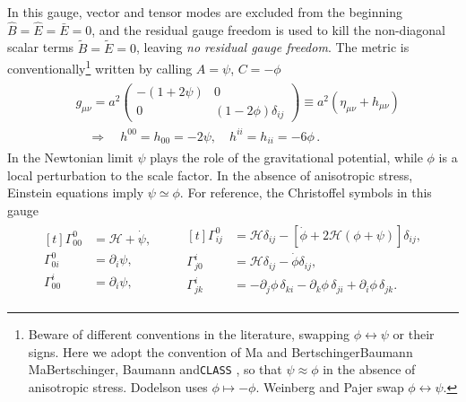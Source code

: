 In this gauge, vector and tensor modes are excluded from the beginning $\hat{B}=\hat{E}=\bar{E}=0$, and the residual gauge freedom is used to kill the non-diagonal scalar terms $\tilde{B}=\tilde{E}=0$, leaving \emph{no residual gauge freedom}.
The metric is conventionally\footnote{Beware of different conventions in the literature, swapping $\phi \leftrightarrow \psi$ or their signs. Here we adopt the convention of Ma and BertschingerBaumann MaBertschinger, Baumann \cite{Baumann_Cosmology_2022} and\texttt{CLASS} \cite{Lesgourgues_CosmicLinearAnisotropySolvingSystemCLASSIOverview_2011}, so that $\psi\approx \phi$ in the absence of anisotropic stress.
Dodelson \cite{DodelsonSchmidt_ModernCosmology_2025} uses $\phi\mapsto -\phi$. Weinberg \cite{Weinberg_AdiabaticModesCosmology_2003,Weinberg_Cosmology_2008} and Pajer swap $\phi\leftrightarrow \psi$.} written by calling $A=\psi$, $C=-\phi$
\begin{align}\label{eq:newtonian_gauge_metric}
\begin{aligned}
    &g_{\mu\nu}=a^2\begin{pmatrix}
        -(1+2\psi) & 0 \\
        0 & (1-2\phi)\delta_{ij}
    \end{pmatrix}\equiv a^2(\eta_{\mu\nu}+h_{\mu\nu})\\[5pt]
    &\quad \Rightarrow \quad h^{00}=h_{00}=-2\psi,\quad h^{ii}=h_{ii}=-6\phi\,.
\end{aligned}
\end{align}
%
In the Newtonian limit $\psi$ plays the role of the gravitational potential, while $\phi$ is a local perturbation to the scale factor.
In the absence of anisotropic stress, Einstein equations imply  $\psi\simeq \phi$.
%
For reference, the Christoffel symbols in this gauge
\begin{align}\label{eq:christoffel_newtonian_gauge}
    \begin{aligned}[t]
    \Gamma_{00}^{0} & =\mathcal{H}+\dot\psi,  \\
    \Gamma_{0 i}^{0} & =\partial_{i} \psi,  \\
    \Gamma_{00}^{i} & = \partial_{i} \psi,
    \end{aligned}
    \qquad
    \begin{aligned}[t]
    \Gamma_{i j}^{0} & =\mathcal{H} \delta_{i j}-\left[\dot\phi+2 \mathcal{H}(\phi+\psi)\right] \delta_{i j}, \\
    \Gamma_{j 0}^{i} & =\mathcal{H} \delta_{ij}-\dot\phi \delta_{ij}, \\
    \Gamma_{j k}^{i} & = -\partial_j \phi\, \delta_{ki} - \partial_k \phi\,\delta_{ji} + \partial_i \phi\,\delta_{jk}.
    \end{aligned}
\end{align}
